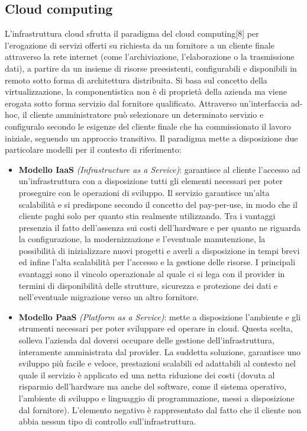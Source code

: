 \subsection{Cloud computing}
L'infrastruttura cloud sfrutta il paradigma del cloud computing[8] per l'erogazione di servizi offerti su richiesta da un fornitore a un cliente finale attraverso la rete internet (come l'archiviazione, l'elaborazione o la trasmissione dati), a partire da un insieme di risorse preesistenti, configurabili e disponibili in remoto sotto forma di architettura distribuita. Si basa sul concetto della virtualizzazione, la componentistica non è di proprietà della azienda ma viene erogata sotto forma servizio dal fornitore qualificato. Attraverso un'interfaccia ad-hoc, il cliente amministratore può selezionare un determinato servizio e configuralo secondo le esigenze del cliente finale che ha commissionato il lavoro iniziale, seguendo un approccio transitivo.
Il paradigma mette a disposizione due particolare modelli per il contesto di riferimento:
\begin{itemize}
    \item \textbf{Modello IaaS} \textit{(Infrastructure as a Service)}: garantisce al cliente l’accesso ad un'infrastruttura con a disposizione tutti gli elementi necessari per poter proseguire con le operazioni di sviluppo. Il servizio garantisce un'alta scalabilità e si predispone secondo il concetto del pay-per-use, in modo che il cliente paghi solo per quanto stia realmente utilizzando. Tra i vantaggi presenzia il fatto dell'assenza sui costi dell'hardware e per quanto ne riguarda la configurazione, la modernizzazione e l'eventuale manutenzione, la possibilità di inizializzare nuovi progetti e averli a disposizione in tempi brevi ed infine l'alta scalabilità per l'accesso e la gestione delle risorse. I principali svantaggi sono il vincolo operazionale al quale ci si lega con il provider in termini di disponibilità delle strutture, sicurezza e protezione dei dati e nell'eventuale migrazione verso un altro fornitore.
    \clearpage
    \item \textbf{Modello PaaS} \textit{(Platform as a Service)}: mette a disposizione l'ambiente e gli strumenti necessari per poter sviluppare ed operare in cloud. Questa scelta, solleva l'azienda dal doversi occupare delle gestione dell'infrastruttura, interamente amministrata dal provider. La suddetta soluzione, garantisce uno sviluppo più facile e veloce, prestazioni scalabili ed adattabili al contesto nel quale il servizio è applicato ed una netta riduzione dei costi (dovuta al risparmio dell'hardware ma anche del software, come il sistema operativo, l'ambiente di sviluppo e linguaggio di programmazione, messi a disposizione dal fornitore). L'elemento negativo è rappresentato dal fatto che il cliente non abbia nessun tipo di controllo sull'infrastruttura.
\end{itemize}

